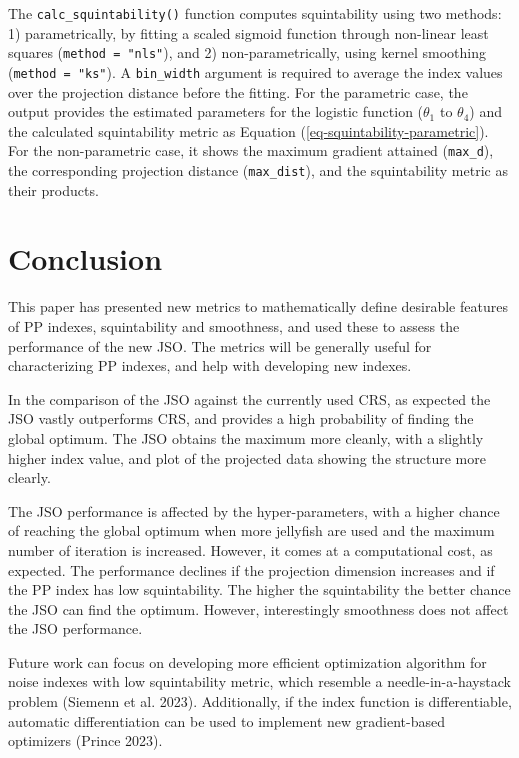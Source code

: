 \documentclass[
  12pt,
]{interact}
\theoremstyle{plain}
\begin{document}
The \texttt{calc\_squintability()} function computes squintability using
two methods: 1) parametrically, by fitting a scaled sigmoid function
through non-linear least squares (\texttt{method\ =\ "nls"}), and 2)
non-parametrically, using kernel smoothing (\texttt{method\ =\ "ks"}). A
\texttt{bin\_width} argument is required to average the index values
over the projection distance before the fitting. For the parametric
case, the output provides the estimated parameters for the logistic
function (\(\theta_1\) to \(\theta_4\)) and the calculated squintability
metric as Equation (\ref{eq-squintability-parametric}). For the
non-parametric case, it shows the maximum gradient attained
(\texttt{max\_d}), the corresponding projection distance
(\texttt{max\_dist}), and the squintability metric as their products.

\section{Conclusion}\label{sec-conclusion}

This paper has presented new metrics to mathematically define desirable
features of PP indexes, squintability and smoothness, and used these to
assess the performance of the new JSO. The metrics will be generally
useful for characterizing PP indexes, and help with developing new
indexes.

In the comparison of the JSO against the currently used CRS, as expected
the JSO vastly outperforms CRS, and provides a high probability of
finding the global optimum. The JSO obtains the maximum more cleanly,
with a slightly higher index value, and plot of the projected data
showing the structure more clearly.

The JSO performance is affected by the hyper-parameters, with a higher
chance of reaching the global optimum when more jellyfish are used and
the maximum number of iteration is increased. However, it comes at a
computational cost, as expected. The performance declines if the
projection dimension increases and if the PP index has low
squintability. The higher the squintability the better chance the JSO
can find the optimum. However, interestingly smoothness does not affect
the JSO performance.

Future work can focus on developing more efficient optimization
algorithm for noise indexes with low squintability metric, which
resemble a needle-in-a-haystack problem (Siemenn et al. 2023).
Additionally, if the index function is differentiable, automatic
differentiation can be used to implement new gradient-based optimizers
(Prince 2023).
\end{document}
